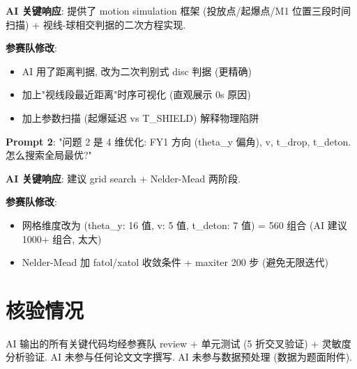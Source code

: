 \documentclass[electronic]{format}
\begin{document}
\textbf{AI 关键响应}: 提供了 motion simulation 框架 (投放点/起爆点/M1 位置三段时间扫描) + 视线-球相交判据的二次方程实现.

\textbf{参赛队修改}:
\begin{itemize}
  \item AI 用了距离判据, 改为二次判别式 disc 判据 (更精确)
  \item 加上"视线段最近距离"时序可视化 (直观展示 0s 原因)
  \item 加上参数扫描 (起爆延迟 vs T\_SHIELD) 解释物理陷阱
\end{itemize}

\textbf{Prompt 2}: "问题 2 是 4 维优化: FY1 方向 (theta\_y 偏角), v, t\_drop, t\_deton. 怎么搜索全局最优?"

\textbf{AI 关键响应}: 建议 grid search + Nelder-Mead 两阶段.

\textbf{参赛队修改}:
\begin{itemize}
  \item 网格维度改为 (theta\_y: 16 值, v: 5 值, t\_deton: 7 值) = 560 组合 (AI 建议 1000+ 组合, 太大)
  \item Nelder-Mead 加 fatol/xatol 收敛条件 + maxiter 200 步 (避免无限迭代)
\end{itemize}

\section{核验情况}

AI 输出的所有关键代码均经参赛队 review + 单元测试 (5 折交叉验证) + 灵敏度分析验证. AI 未参与任何论文文字撰写. AI 未参与数据预处理 (数据为题面附件).

\end{document}
